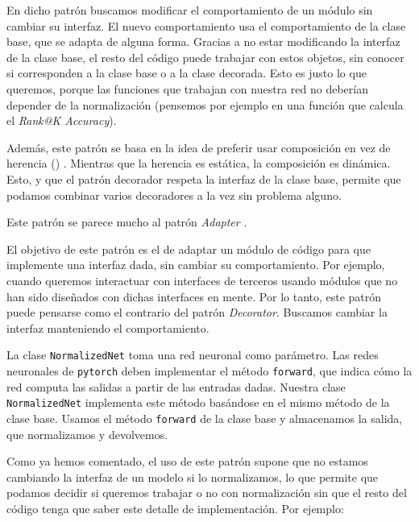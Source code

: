 En dicho patrón buscamos modificar el comportamiento de un módulo sin cambiar su interfaz. El nuevo comportamiento usa el comportamiento de la clase base, que se adapta de alguna forma. Gracias a no estar modificando la interfaz de la clase base, el resto del código puede trabajar con estos objetos, sin conocer si corresponden a la clase base o a la clase decorada. Esto es justo lo que queremos, porque las funciones que trabajan con nuestra red no deberían depender de la normalización (pensemos por ejemplo en una función que calcula el \textit{Rank@K Accuracy}).

Además, este patrón se basa en la idea de preferir usar composición en vez de herencia () \cite{informatica:comp_over_inh}. Mientras que la herencia es estática, la composición es dinámica. Esto, y que el patrón decorador respeta la interfaz de la clase base, permite que podamos combinar varios decoradores a la vez sin problema alguno.

\begin{observacion}

    Este patrón se parece mucho al patrón \textit{Adapter} \cite{informatica:design_patterns} \cite{informatica:adapter_pattern}.

    El objetivo de este patrón es el de adaptar un módulo de código para que implemente una interfaz dada, sin cambiar su comportamiento. Por ejemplo, cuando queremos interactuar con interfaces de terceros usando módulos que no han sido diseñados con dichas interfaces en mente. Por lo tanto, este patrón puede pensarse como el contrario del patrón \textit{Decorator}. Buscamos cambiar la interfaz manteniendo el comportamiento.

\end{observacion}

La clase \lstinline{NormalizedNet} toma una red neuronal como parámetro. Las redes neuronales de \lstinline{pytorch} deben implementar el método \lstinline{forward}, que indica cómo la red computa las salidas a partir de las entradas dadas. Nuestra clase \lstinline{NormalizedNet} implementa este método basándose en el mismo método de la clase base. Usamos el método \lstinline{forward} de la clase base y almacenamos la salida, que normalizamos y devolvemos.

Como ya hemos comentado, el uso de este patrón supone que no estamos cambiando la interfaz de un modelo si lo normalizamos, lo que permite que podamos decidir si queremos trabajar o no con normalización sin que el resto del código tenga que saber este detalle de implementación. Por ejemplo:

